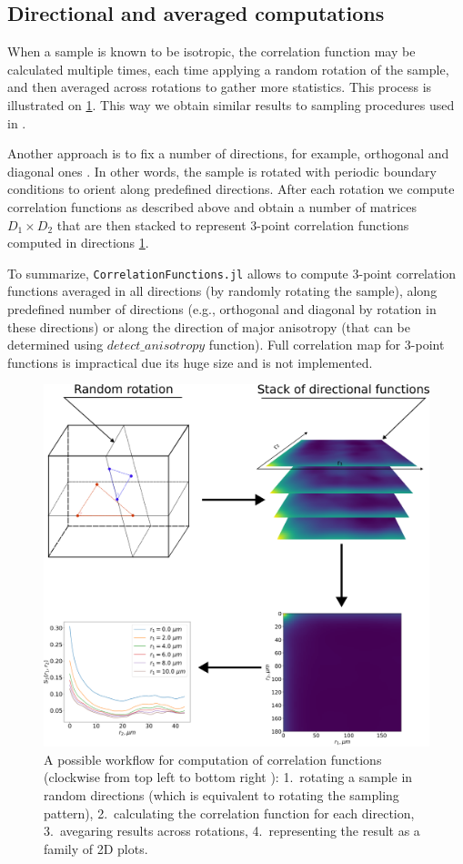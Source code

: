 \documentclass[reprint,amsmath,amssymb,aps,pre,showkeys,showpacs]{revtex4-1}
\newcommand{\code}[1]{\colorbox{light-gray}{\texttt{#1}}}
\begin{document}
\subsection{Directional and averaged computations}
When a sample is known to be isotropic, the correlation function may be
calculated multiple times, each time applying a random rotation of the sample,
and then averaged across rotations to gather more statistics. This process is
illustrated on \cref{fig:workflow}. This way we obtain similar results to
sampling procedures used in \cite{berryman1988,SMITH1988176,malmir2018}.

Another approach is to fix a number of directions, for example, orthogonal and
diagonal ones \cite{EPL1,EPL2,CFsjlpaper}. In other words, the sample is rotated
with periodic boundary conditions to orient along predefined directions. After
each rotation we compute correlation functions as described above and obtain a
number of matrices $D_1 \times D_2$ that are then stacked to represent 3-point
correlation functions computed in directions \cref{fig:workflow}.

To summarize, \code{CorrelationFunctions.jl} allows to compute 3-point
correlation functions averaged in all directions (by randomly rotating the
sample), along predefined number of directions (e.g., orthogonal and diagonal by
rotation in these directions) or along the direction of major anisotropy (that
can be determined using \code{$detect\_anisotropy$} function).  Full correlation
map for 3-point functions is impractical due its huge size and is not
implemented.

\begin{figure}[tp]
  \centering
  \includegraphics[width=0.6\linewidth]{images/workflow.png}
  \caption[]{A possible workflow for computation of correlation functions
    (clockwise from top left to bottom right ): 1.~rotating a sample in random
    directions (which is equivalent to rotating the sampling pattern),
    2.~calculating the correlation function for each direction, 3.~avegaring
    results across rotations, 4.~representing the result as a family of 2D
    plots.}
  \label{fig:workflow}
\end{figure}
\end{document}
